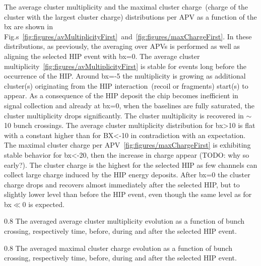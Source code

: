 The average cluster multiplicity and the maximal cluster charge~(charge of the cluster with the largest cluster charge) distributions per APV as a function of the bx are shown in Fig.s~\ref{fig:figures/avMultiplicityFirst}~and~\ref{fig:figures/maxChargeFirst}. In these distributions, as previously, the averaging over APVs is performed as well as aligning the selected HIP event with bx=0. The average cluster multiplicity~\ref{fig:figures/avMultiplicityFirst} is stable for events long before the occurrence of the HIP. Around bx=-5 the multiplicity is growing as additional cluster(s) originating from the HIP interaction~(recoil or fragments) start(s) to appear. As a consequence of the HIP deposit the chip becomes inefficient in signal collection and already at bx=0, when the baselines are fully saturated, the cluster multiplicity drops significantly. The cluster multiplicity is recovered in $\sim$10 bunch crossings. The average cluster multiplicity distribution for bx>10 is flat with a constant higher than for BX<-10 in contradiction with an expectation. The maximal cluster charge per APV~\ref{fig:figures/maxChargeFirst} is exhibiting stable behavior for bx<-20, then the increase in charge appear (TODO: why so early?). The cluster charge is the highest for the selected HIP as few channels can collect large charge induced by the HIP energy deposits. After bx=0 the cluster charge drops and recovers almost immediately after the selected HIP, but to slightly lower level than before the HIP event, even though the same level as for bx$\ll$0 is expected. 



                 {0.8}       %
                 {The averaged average cluster multiplicity evolution as a function of bunch crossing, respectively time, before, during and after the selected HIP event. } %

                 {0.8}       %
                 {The averaged maximal cluster charge evolution as a function of bunch crossing, respectively time, before, during and after the selected HIP event. } %

